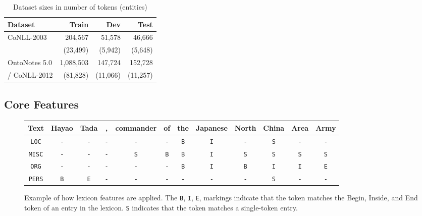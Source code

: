 \documentclass[11pt,letterpaper]{article}
\begin{document}
\begin{table}[t]
\begin{center}
\small
\begin{tabular}{|l|r|r|r|}
\hline \bf Dataset & \bf Train & \bf Dev & \bf Test \\ \hline
CoNLL-2003 & 204,567 & 51,578 & 46,666\\
& (23,499) & (5,942) & (5,648)\\ \hline
OntoNotes 5.0 & 1,088,503 & 147,724 & 152,728\\
 / CoNLL-2012 & (81,828) & (11,066) & (11,257)\\
\hline
\end{tabular}
\end{center}
\caption{Dataset sizes in number of tokens (entities)}
\label{tab:dataset}
\end{table} 


\subsection{Core Features}

\begin{figure*}[ht!]
\begin{center}
\small
\begin{tabular}{c|ccccccccccc}
\small
Text & Hayao & Tada & , & commander & of & the & Japanese & North & China & Area & Army \\ \hline

{\tt LOC}  & {\tt -} & {\tt -} & {\tt -} & {\tt -} & {\tt -} & {\tt B} & {\tt I} & {\tt -} & {\tt S} & {\tt -} & {\tt -} \\
{\tt MISC} & {\tt -} & {\tt -} & {\tt -} & {\tt S} & {\tt B} & {\tt B} & {\tt I} & {\tt S} & {\tt S} & {\tt S} & {\tt S} \\
{\tt ORG}  & {\tt -} & {\tt -} & {\tt -} & {\tt -} & {\tt -} & {\tt B} & {\tt I} & {\tt B} & {\tt I} & {\tt I} & {\tt E} \\
{\tt PERS} & {\tt B} & {\tt E} & {\tt -} & {\tt -} & {\tt -} & {\tt -} & {\tt -} & {\tt -} & {\tt S} & {\tt -} & {\tt -}  
\end{tabular}
\end{center}
\caption{Example of how lexicon features are applied. The {\tt B}, {\tt I}, {\tt E}, markings indicate that the token matches the Begin, Inside, and End token of an entry in the lexicon. {\tt S} indicates that the token matches a single-token entry.}
\label{fig:lexicon-example}
\end{figure*}
\end{document}

